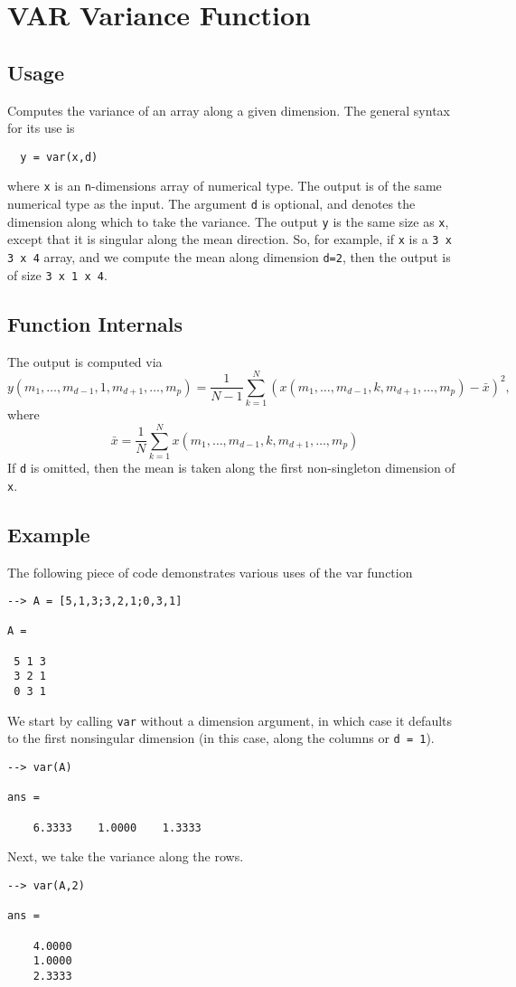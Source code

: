 \section{VAR Variance Function}

\subsection{Usage}

Computes the variance of an array along a given dimension.  The general
syntax for its use is
\begin{verbatim}
  y = var(x,d)
\end{verbatim}
where \verb|x| is an \verb|n|-dimensions array of numerical type.
The output is of the same numerical type as the input.  The argument
\verb|d| is optional, and denotes the dimension along which to take
the variance.  The output \verb|y| is the same size as \verb|x|, except
that it is singular along the mean direction.  So, for example,
if \verb|x| is a \verb|3 x 3 x 4| array, and we compute the mean along
dimension \verb|d=2|, then the output is of size \verb|3 x 1 x 4|.
\subsection{Function Internals}

The output is computed via
\[
y(m_1,\ldots,m_{d-1},1,m_{d+1},\ldots,m_{p}) = \frac{1}{N-1}
\sum_{k=1}^{N} \left(x(m_1,\ldots,m_{d-1},k,m_{d+1},\ldots,m_{p}) 
 - \bar{x}\right)^2,
\]
where 
\[
\bar{x}  = \frac{1}{N}
\sum_{k=1}^{N} x(m_1,\ldots,m_{d-1},k,m_{d+1},\ldots,m_{p})
\]
If \verb|d| is omitted, then the mean is taken along the 
first non-singleton dimension of \verb|x|. 
\subsection{Example}

The following piece of code demonstrates various uses of the var
function
\begin{verbatim}
--> A = [5,1,3;3,2,1;0,3,1]

A = 

 5 1 3 
 3 2 1 
 0 3 1 
\end{verbatim}
We start by calling \verb|var| without a dimension argument, in which 
case it defaults to the first nonsingular dimension (in this case, 
along the columns or \verb|d = 1|).
\begin{verbatim}
--> var(A)

ans = 

    6.3333    1.0000    1.3333 
\end{verbatim}
Next, we take the variance along the rows.
\begin{verbatim}
--> var(A,2)

ans = 

    4.0000 
    1.0000 
    2.3333 
\end{verbatim}
